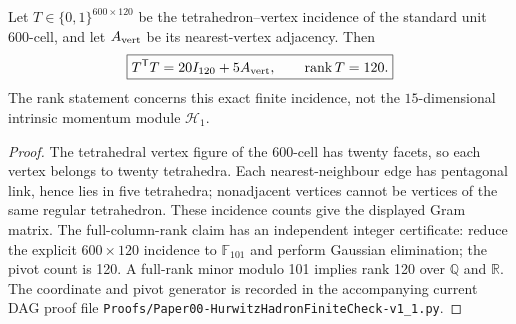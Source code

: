 \documentclass[11pt]{article}
\begin{document}
\begin{theorem}
\label{p1:thm:v365-600-cell-incidence}
Let $T\in\{0,1\}^{600\times120}$ be the tetrahedron--vertex
incidence of the standard unit 600-cell, and let $A_{\rm vert}$ be its
nearest-vertex adjacency.  Then
\[
  \boxed{T^{\mathsf T}T=20I_{120}+5A_{\rm vert},\qquad
  \operatorname{rank}T=120.}
\]
The rank statement concerns this exact finite incidence, not the
$15$-dimensional intrinsic momentum module $\mathcal H_1$.
\end{theorem}
\begin{proof}
The tetrahedral vertex figure of the 600-cell has twenty facets,
so each vertex belongs to twenty tetrahedra.  Each nearest-neighbour
edge has pentagonal link, hence lies in five tetrahedra; nonadjacent
vertices cannot be vertices of the same regular tetrahedron.  These
incidence counts give the displayed Gram matrix.  The full-column-rank
claim has an independent integer certificate: reduce the explicit
$600\times120$ incidence to $\mathbb F_{101}$ and perform Gaussian
elimination; the pivot count is 120.  A full-rank minor modulo 101
implies rank 120 over $\mathbb Q$ and $\mathbb R$.  The coordinate
and pivot generator is recorded in the accompanying current DAG proof
file \texttt{Proofs/Paper00-HurwitzHadronFiniteCheck-v1\_1.py}.
\end{proof}
\end{document}
